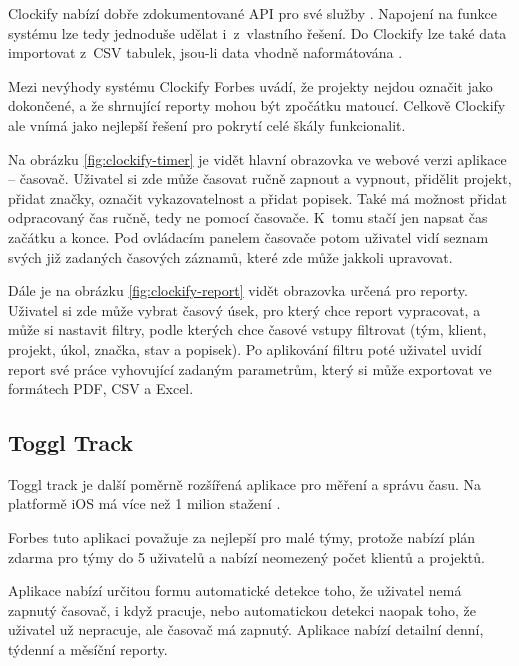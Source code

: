 Clockify nabízí dobře zdokumentované API pro své služby \cite{clockify-api}. Napojení na funkce systému lze tedy jednoduše udělat i~z~vlastního řešení. Do Clockify lze také data importovat z~CSV tabulek, jsou-li data vhodně naformátována \cite{clockify-import-timesheets}.

Mezi nevýhody systému Clockify Forbes uvádí, že projekty nejdou označit jako dokončené, a že shrnující reporty mohou být zpočátku matoucí. Celkově Clockify ale vnímá jako nejlepší řešení pro pokrytí celé škály funkcionalit.

Na obrázku \ref{fig:clockify-timer} je vidět hlavní obrazovka ve webové verzi aplikace – časovač. Uživatel si zde může časovat ručně zapnout a vypnout, přidělit projekt, přidat značky, označit vykazovatelnost a přidat popisek. Také má možnost přidat odpracovaný čas ručně, tedy ne pomocí časovače. K~tomu stačí jen napsat čas začátku a konce. Pod ovládacím panelem časovače potom uživatel vidí seznam svých již zadaných časových záznamů, které zde může jakkoli upravovat.

Dále je na obrázku \ref{fig:clockify-report} vidět obrazovka určená pro reporty. Uživatel si zde může vybrat časový úsek, pro který chce report vypracovat, a může si nastavit filtry, podle kterých chce časové vstupy filtrovat (tým, klient, projekt, úkol, značka, stav a popisek). Po aplikování filtru poté uživatel uvidí report své práce vyhovující zadaným parametrům, který si může exportovat ve formátech PDF, CSV a Excel.

\subsection{Toggl Track}

Toggl track je další poměrně rozšířená aplikace pro měření a správu času. Na platformě iOS má více než 1 milion stažení \cite{toggl-track-app-magic}. 

Forbes tuto aplikaci považuje za nejlepší pro malé týmy, protože nabízí plán zdarma pro týmy do 5 uživatelů a nabízí neomezený počet klientů a projektů. \cite{forbes-tracking-apps-article}

Aplikace nabízí určitou formu automatické detekce toho, že uživatel nemá zapnutý časovač, i když pracuje, nebo automatickou detekci naopak toho, že uživatel už nepracuje, ale časovač má zapnutý. Aplikace nabízí detailní denní, týdenní a měsíční reporty.

